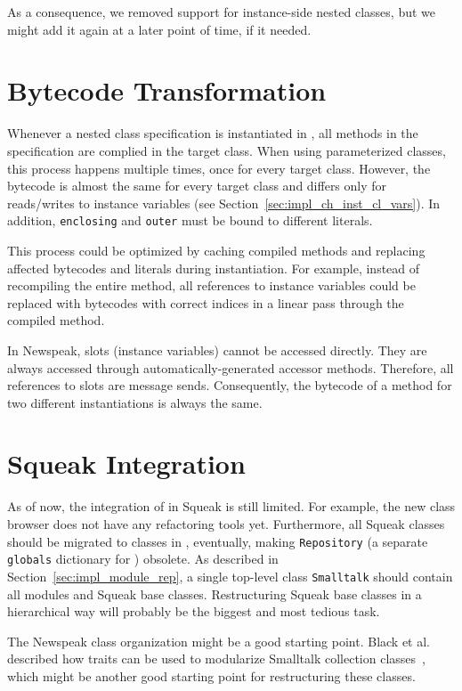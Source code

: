 As a consequence, we removed support for instance-side nested classes, but we might add it again at a later point of time, if it needed.

\section{Bytecode Transformation}
Whenever a nested class specification is instantiated in \msname, all methods in the specification are complied in the target class. When using parameterized classes, this process happens multiple times, once for every target class. However, the bytecode is almost the same for every target class and differs only for reads/writes to instance variables (see Section~\ref{sec:impl_ch_inst_cl_vars}). In addition, \texttt{enclosing} and \texttt{outer} must be bound to different literals.

This process could be optimized by caching compiled methods and replacing affected bytecodes and literals during instantiation. For example, instead of recompiling the entire method, all references to instance variables could be replaced with bytecodes with correct indices in a linear pass through the compiled method.

In Newspeak, slots (instance variables) cannot be accessed directly. They are always accessed through automatically-generated accessor methods. Therefore, all references to slots are message sends. Consequently, the bytecode of a method for two different instantiations is always the same.

\section{Squeak Integration}
As of now, the integration of \msname in Squeak is still limited. For example, the new class browser does not have any refactoring tools yet. Furthermore, all Squeak classes should be migrated to classes in \msname, eventually, making \texttt{Repository} (a separate \texttt{globals} dictionary for \msname) obsolete. As described in Section~\ref{sec:impl_module_rep}, a single top-level class \texttt{Smalltalk} should contain all modules and Squeak base classes. Restructuring Squeak base classes in a hierarchical way will probably be the biggest and most tedious task. 

The Newspeak class organization might be a good starting point. Black et al. described how traits can be used to modularize Smalltalk collection classes~\cite{Black:2003:ATS:949305.949311}, which might be another good starting point for restructuring these classes.

